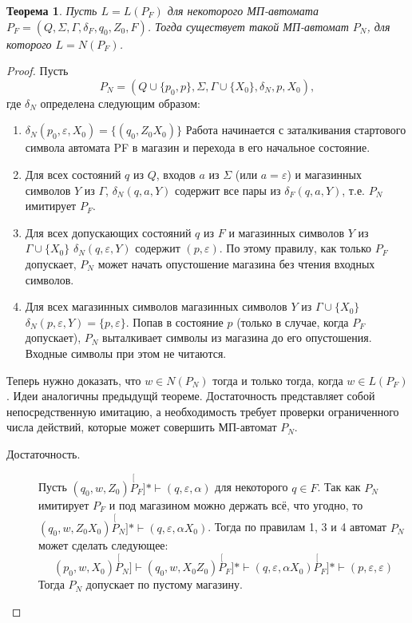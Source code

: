 \documentclass[a4paper,12pt]{article}
\newtheorem*{theorem}{Теорема}
\begin{document}
\begin{theorem}
	Пусть \(L = L(P_F)\) для некоторого МП-автомата \(P_F = (Q, \Sigma, \Gamma, \delta_F, q_0, Z_0, F)\). Тогда существует такой МП-автомат \(P_N\), для которого \(L = N(P_F)\).
\end{theorem} 
\begin{proof}
	Пусть \[P_N = (Q \cup \{p_0, p\}, \Sigma, \Gamma \cup \{X_0\}, \delta_N, p, X_0),\]
	где \(\delta_N\) определена следующим образом:
	\begin{enumerate}
		\item \(\delta_N(p_0, \varepsilon, X_0) = \{(q_0, Z_0X_0)\}\) Работа начинается с заталкивания стартового символа автомата PF в магазин и перехода в его начальное состояние.
		\item Для всех состояний \(q\) из \(Q\), входов \(a\) из \(\Sigma\) (или \(a = \varepsilon\)) и магазинных символов \(Y\) из \(\Gamma\), \(\delta_N(q, a, Y)\) содержит все пары из \(\delta_F(q, a, Y)\), т.е. \(P_N\) имитирует \(P_F\).
		\item Для всех допускающих состояний \(q\) из \(F\) и магазинных символов \(Y\) из \(\Gamma \cup \{X_0\}\) \(\delta_N(q, \varepsilon, Y)\) содержит \((p, \varepsilon)\). По этому правилу, как только \(P_F\) допускает, \(P_N\) может начать опустошение магазина без чтения входных символов.
		\item Для всех магазинных символов магазинных символов \(Y\) из \(\Gamma \cup \{X_0\}\) \(\delta_N(p, \varepsilon, Y) = \{p, \varepsilon\}\). Попав в состояние \(p\) (только в случае, когда \(P_F\) допускает), \(P_N\) выталкивает символы из магазина до его опустошения. Входные символы при этом не читаются.
	\end{enumerate}
	Теперь нужно доказать, что \(w \in N(P_N)\) тогда и только тогда, когда \(w \in L(P_F)\). Идеи аналогичны предыдущй теореме. Достаточность представляет собой непосредственную имитацию, а необходимость требует проверки ограниченного числа действий, которые может совершить МП-автомат \(P_N\).
	\begin{description}
		\item[Достаточность.] Пусть \((q_0, w, Z_0) \stackrel[P_F]{*}{\vdash} (q, \varepsilon, \alpha)\) для некоторого \(q \in F\). Так как \(P_N\) имитирует \(P_F\) и под магазином можно держать всё, что угодно, то \((q_0, w, Z_0 X_0) \stackrel[P_N]{*}{\vdash} (q, \varepsilon, \alpha X_0)\). Тогда по правилам 1, 3 и 4 автомат \(P_N\) может сделать следующее:
		\[(p_0, w, X_0) \stackrel[P_N]{}{\vdash} (q_0, w, X_0Z_0)  \stackrel[P_F]{*}{\vdash} (q, \varepsilon, \alpha X_0) \stackrel[P_F]{*}{\vdash} (p, \varepsilon, \varepsilon)\]
		Тогда \(P_N\) допускает по пустому магазину.
		

\end{description}
\end{proof}
\end{document}
